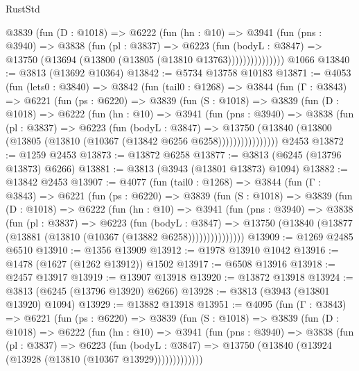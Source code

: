 \begin{lexlean}{RustStd}
\begin{coremodule}
              @3839
                (fun (D : @1018) =>
                @6222
                  (fun (hn : @10) =>
                  @3941
                    (fun (pns : @3940) =>
                    @3838
                      (fun (pl : @3837) =>
                      @6223
                        (fun (bodyL : @3847) =>
                        @13750 (@13694 (@13800 (@13805 (@13810 @13763)))))))))))))))
    @1066
@13840 := @3813 (@13692 @10364)
@13842 := @5734 @13758 @10183
@13871 := @4053
    (fun (lets0 : @3840) =>
    @3842
      (fun (tail0 : @1268) =>
      @3844
        (fun (Γ : @3843) =>
        @6221
          (fun (ps : @6220) =>
          @3839
            (fun (S : @1018) =>
            @3839
              (fun (D : @1018) =>
              @6222
                (fun (hn : @10) =>
                @3941
                  (fun (pns : @3940) =>
                  @3838
                    (fun (pl : @3837) =>
                    @6223
                      (fun (bodyL : @3847) =>
                      @13750
                        (@13840 (@13800 (@13805 (@13810 (@10367 (@13842 @6256 @6258))))))))))))))))
    @2453
@13872 := @1259 @2453
@13873 := @13872 @6258
@13877 := @3813 (@6245 (@13796 @13873) @6266)
@13881 := @3813 (@3943 (@13801 @13873) @1094)
@13882 := @13842 @2453
@13907 := @4077
    (fun (tail0 : @1268) =>
    @3844
      (fun (Γ : @3843) =>
      @6221
        (fun (ps : @6220) =>
        @3839
          (fun (S : @1018) =>
          @3839
            (fun (D : @1018) =>
            @6222
              (fun (hn : @10) =>
              @3941
                (fun (pns : @3940) =>
                @3838
                  (fun (pl : @3837) =>
                  @6223
                    (fun (bodyL : @3847) =>
                    @13750 (@13840 (@13877 (@13881 (@13810 (@10367 (@13882 @6258)))))))))))))))
@13909 := @1269 @2485 @6510
@13910 := @1356 @13909
@13912 := @1978 @13910 @1042
@13916 := @1478 (@1627 (@1262 @13912)) @1502
@13917 := @6508 @13916
@13918 := @2457 @13917
@13919 := @13907 @13918
@13920 := @13872 @13918
@13924 := @3813 (@6245 (@13796 @13920) @6266)
@13928 := @3813 (@3943 (@13801 @13920) @1094)
@13929 := @13882 @13918
@13951 := @4095
    (fun (Γ : @3843) =>
    @6221
      (fun (ps : @6220) =>
      @3839
        (fun (S : @1018) =>
        @3839
          (fun (D : @1018) =>
          @6222
            (fun (hn : @10) =>
            @3941
              (fun (pns : @3940) =>
              @3838
                (fun (pl : @3837) =>
                @6223
                  (fun (bodyL : @3847) =>
                  @13750 (@13840 (@13924 (@13928 (@13810 (@10367 @13929)))))))))))))

\end{coremodule}
\end{lexlean}
